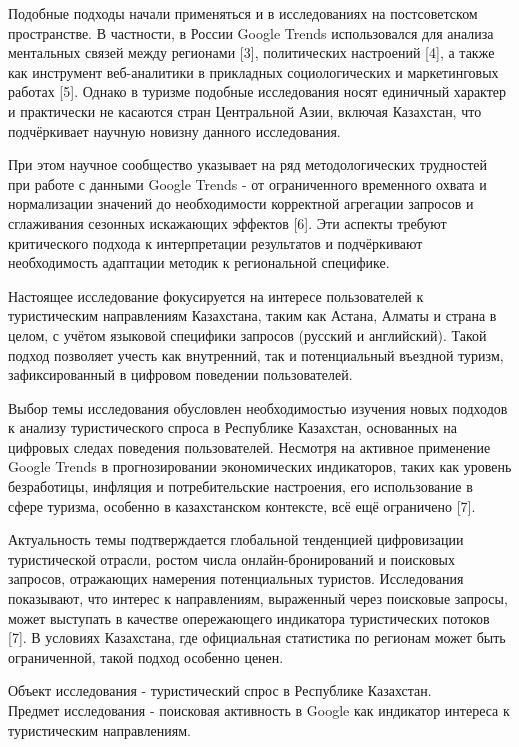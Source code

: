 Подобные подходы начали применяться и в исследованиях на постсоветском
пространстве. В частности, в России Google Trends использовался для
анализа ментальных связей между регионами {[}3{]}, политических
настроений {[}4{]}, а также как инструмент веб-аналитики в прикладных
социологических и маркетинговых работах {[}5{]}. Однако в туризме
подобные исследования носят единичный характер и практически не касаются
стран Центральной Азии, включая Казахстан, что подчёркивает научную
новизну данного исследования.

При этом научное сообщество указывает на ряд методологических трудностей
при работе с данными Google Trends - от ограниченного временного охвата
и нормализации значений до необходимости корректной агрегации запросов и
сглаживания сезонных искажающих эффектов {[}6{]}. Эти аспекты требуют
критического подхода к интерпретации результатов и подчёркивают
необходимость адаптации методик к региональной специфике.

Настоящее исследование фокусируется на интересе пользователей к
туристическим направлениям Казахстана, таким как Астана, Алматы и страна
в целом, с учётом языковой специфики запросов (русский и английский).
Такой подход позволяет учесть как внутренний, так и потенциальный
въездной туризм, зафиксированный в цифровом поведении пользователей.

Выбор темы исследования обусловлен необходимостью изучения новых
подходов к анализу туристического спроса в Республике Казахстан,
основанных на цифровых следах поведения пользователей. Несмотря на
активное применение Google Trends в прогнозировании экономических
индикаторов, таких как уровень безработицы, инфляция и потребительские
настроения, его использование в сфере туризма, особенно в казахстанском
контексте, всё ещё ограничено {[}7{]}.

Актуальность темы подтверждается глобальной тенденцией цифровизации
туристической отрасли, ростом числа онлайн-бронирований и поисковых
запросов, отражающих намерения потенциальных туристов. Исследования
показывают, что интерес к направлениям, выраженный через поисковые
запросы, может выступать в качестве опережающего индикатора
туристических потоков {[}7{]}. В условиях Казахстана, где официальная
статистика по регионам может быть ограниченной, такой подход особенно
ценен.

Объект исследования - туристический спрос в Республике Казахстан.\\
Предмет исследования - поисковая активность в Google как индикатор
интереса к туристическим направлениям.

